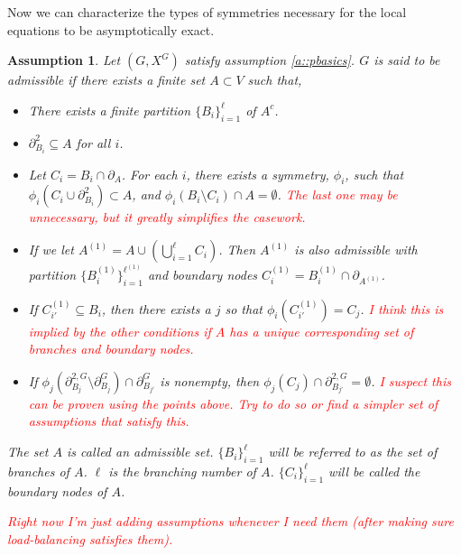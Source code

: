 \documentclass[12pt]{article}
\newcommand{\tr}{\textcolor{red}}
\newcommand{\ind}{\hspace{24pt}}
\newcommand{\neigh}[1]{\partial_{#1}}				%
\newcommand{\dneigh}[1]{\partial^2_{#1}}			%
\newcommand{\gneigh}[2]{\partial^{#1}_{#2}}			%
\newcommand{\dgneigh}[2]{\partial^{2,#1}_{#2}}		%
\newcommand{\Xf}{X}									%
\newcommand{\gind}[1]{^{#1}}						%
\newcommand{\psize}{\ell}							%
\newtheorem{assu}[thms]{Assumption}
\begin{document}
Now we can characterize the types of symmetries necessary for the local equations to be asymptotically exact.

\begin{assu}
Let \((G,\Xf\gind{G})\) satisfy assumption \ref{a::pbasics}. \(G\) is said to be admissible if there exists a finite set \(A \subset V\) such that,

\begin{itemize}
\item There exists a finite partition \(\{B_i\}_{i=1}^\psize\) of \(A^c\).

\item \(\dneigh{B_i} \subseteq A\) for all \(i\).

\item Let \(C_i = B_i\cap\neigh{A}\). For each \(i\), there exists a symmetry, \(\phi_i\), such that \(\phi_i(C_i\cup \dneigh{B_i}) \subset A\), and \(\phi_i(B_i\setminus C_i)\cap A = \emptyset\). \tr{The last one may be unnecessary, but it greatly simplifies the casework.}

\item If we let \(A^{(1)} = A\cup \left(\bigcup_{i=1}^\psize C_i\right)\). Then \(A^{(1)}\) is also admissible with partition \(\{B^{(1)}_i\}_{i=1}^{\psize^{(1)}}\) and boundary nodes \(C^{(1)}_i = B^{(1)}_i\cap \neigh{A^{(1)}}\).

\item If \(C^{(1)}_{i'} \subseteq B_i\), then there exists a \(j\) so that \(\phi_i(C^{(1)}_{i'}) = C_j\). \tr{I think this is implied by the other conditions if \(A\) has a unique corresponding set of branches and boundary nodes.}

\item If \(\phi_j(\dgneigh{G}{B_j}\setminus\gneigh{G}{B_j})\cap\gneigh{G}{B_{j'}}\) is nonempty, then \(\phi_j(C_j)\cap\dgneigh{G}{B_{j'}} = \emptyset\). \tr{I suspect this can be proven using the points above. Try to do so or find a simpler set of assumptions that satisfy this.}
\end{itemize}

The set \(A\) is called an admissible set. \(\{B_i\}_{i=1}^\psize\) will be referred to as the set of branches of \(A\). \(\psize\) is the branching number of \(A\). \(\{C_i\}_{i=1}^\psize\) will be called the boundary nodes of \(A\).

\ind \tr{Right now I'm just adding assumptions whenever I need them (after making sure load-balancing satisfies them).}
\label{a::admissible}
\end{assu}
\end{document}
